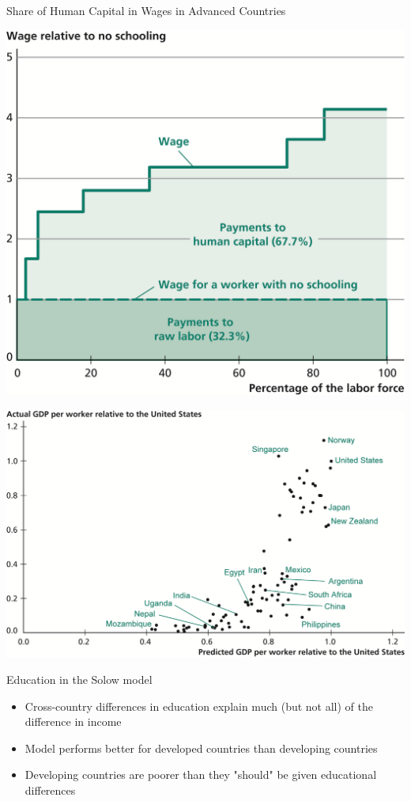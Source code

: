 \documentclass[10pt]{beamer}
\begin{document}
\begin{frame}[label={sec:orge53b139}]{Share of Human Capital in Wages in Advanced Countries}
\begin{center}
\includegraphics[width=.75\textwidth]{./img/6.10.png}
\end{center}
\end{frame}

\begin{frame}[label={sec:orgfff7292}]{}
\begin{center}
\includegraphics[width=.75\textwidth]{./img/6.12.png}
\end{center}
\end{frame}

\begin{frame}[label={sec:orgd2d5eec}]{}
\alert{Education in the Solow model}
\begin{itemize}
\item Cross-country differences in education explain much (but not all) of the difference in income
\item Model performs better for developed countries than developing countries
\item Developing countries are poorer than they "should" be given educational differences
\end{itemize}
\end{frame}
\end{document}
